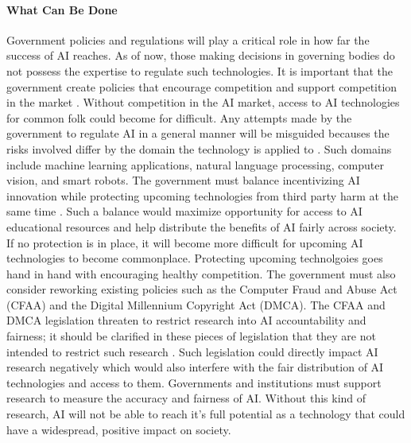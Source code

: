 \documentclass[12pt]{article}
\begin{document}
\paragraph{What Can Be Done\\}
Government policies and regulations will play a critical role in how far the success of AI reaches. As of now, those making decisions in governing bodies do not possess the expertise to regulate such technologies. It is important that the government create policies that encourage competition and support competition in the market \cite{gov}. Without competition in the AI market, access to AI technologies for common folk could become for difficult. Any attempts made by the government to regulate AI in a general manner will be misguided becauses the risks involved differ by the domain the technology is applied to \cite[pg. 48]{twentythirty}. Such domains include machine learning applications, natural language processing, computer vision, and smart robots. The government must balance incentivizing AI innovation while protecting upcoming technologies from third party harm at the same time \cite[pg. 47]{twentythirty}. Such a balance would maximize opportunity for access to AI educational resources and help distribute the benefits of AI fairly across society. If no protection is in place, it will become more difficult for upcoming AI technologies to become commonplace. Protecting upcoming technolgoies goes hand in hand with encouraging healthy competition. The government must also consider reworking existing policies such as the Computer Fraud and Abuse Act (CFAA) and the Digital Millennium Copyright Act (DMCA). The CFAA and DMCA legislation threaten to restrict research into AI accountability and fairness; it should be clarified in these pieces of legislation that they are not intended to restrict such research \cite[pg. 4]{now}. Such legislation could directly impact AI research negatively which would also interfere with the fair distribution of AI technologies and access to them. Governments and institutions must support research to measure the accuracy and fairness of AI. Without this kind of research, AI will not be able to reach it's full potential as a technology that could have a widespread, positive impact on society. 
\end{document}
